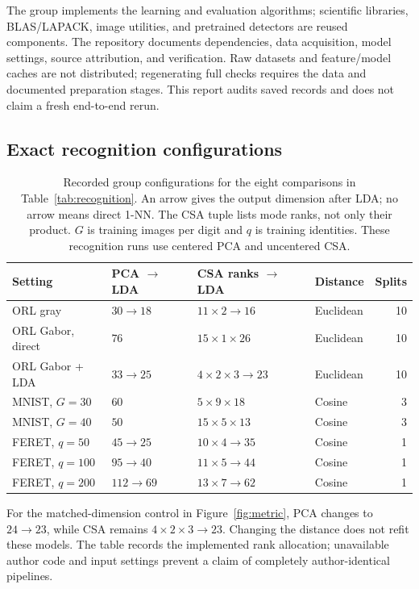 The group implements the learning and evaluation algorithms; scientific
libraries, BLAS/LAPACK, image utilities, and pretrained detectors are reused
components. The repository documents dependencies, data acquisition, model
settings, source attribution, and verification. Raw datasets and feature/model
caches are not distributed; regenerating full checks requires the data and
documented preparation stages. This report audits saved records and does not
claim a fresh end-to-end rerun.

\subsection{Exact recognition configurations}
\begin{table}[!ht]
\centering
\small
\setlength{\tabcolsep}{4pt}
\caption{Recorded group configurations for the eight comparisons in
Table~\ref{tab:recognition}. An arrow gives the output dimension after LDA;
no arrow means direct 1-NN. The CSA tuple lists mode ranks, not only their
product. $G$ is training images per digit and $q$ is training identities.
These recognition runs use centered PCA and uncentered CSA.}
\label{tab:configurations}
\begin{tabular}{@{}llllr@{}}
\toprule
Setting & PCA $\to$ LDA & CSA ranks $\to$ LDA & Distance & Splits\\
\midrule
ORL gray & $30\to18$ & $11\times2\to16$ & Euclidean & 10\\
ORL Gabor, direct & $76$ & $15\times1\times26$ & Euclidean & 10\\
ORL Gabor + LDA & $33\to25$ & $4\times2\times3\to23$ & Euclidean & 10\\
MNIST, $G=30$ & $60$ & $5\times9\times18$ & Cosine & 3\\
MNIST, $G=40$ & $50$ & $15\times5\times13$ & Cosine & 3\\
FERET, $q=50$ & $45\to25$ & $10\times4\to35$ & Cosine & 1\\
FERET, $q=100$ & $95\to40$ & $11\times5\to44$ & Cosine & 1\\
FERET, $q=200$ & $112\to69$ & $13\times7\to62$ & Cosine & 1\\
\bottomrule
\end{tabular}
\end{table}
\FloatBarrier
For the matched-dimension control in Figure~\ref{fig:metric}, PCA changes to
$24\to23$, while CSA remains $4\times2\times3\to23$.
Changing the distance does not refit these models. The table records the
implemented rank allocation; unavailable author code and input settings
prevent a claim of completely author-identical pipelines.

